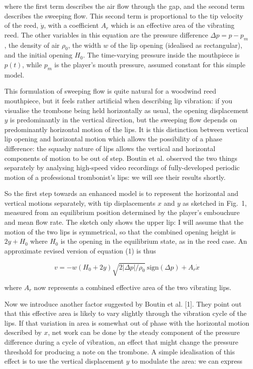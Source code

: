   where the first term describes the air flow through the gap, and the second 
  term describes the sweeping flow. This second term is proportional to the tip 
  velocity of the reed, $\dot{y}$, with a coefficient $A_r$ which is an 
  effective area of the vibrating reed. The other variables in this equation 
  are the pressure difference $\Delta p = p-p_m$, the density of air $\rho_0$, 
  the width $w$ of the lip opening (idealised as rectangular), and the initial 
  opening $H_0$. The time-varying pressure inside the mouthpiece is $p(t)$, 
  while $p_m$ is the player's mouth pressure, assumed constant for this simple 
  model. 

  This formulation of sweeping flow is quite natural for a woodwind reed 
  mouthpiece, but it feels rather artificial when describing lip vibration: if 
  you visualise the trombone being held horizontally as usual, the opening 
  displacement $y$ is predominantly in the vertical direction, but the sweeping 
  flow depends on predominantly horizontal motion of the lips. It is this 
  distinction between vertical lip opening and horizontal motion which allows 
  the possibility of a phase difference: the squashy nature of lips allows the 
  vertical and horizontal components of motion to be out of step. Boutin et al. 
  observed the two things separately by analysing high-speed video recordings 
  of fully-developed periodic motion of a professional trombonist's lips: we 
  will see their results shortly. 

  So the first step towards an enhanced model is to represent the horizontal 
  and vertical motions separately, with tip displacements $x$ and $y$ as 
  sketched in Fig.\ 1, measured from an equilibrium position determined by the 
  player's embouchure and mean flow rate. The sketch only shows the upper lip: 
  I will assume that the motion of the two lips is symmetrical, so that the 
  combined opening height is $2y+H_0$ where $H_0$ is the opening in the 
  equilibrium state, as in the reed case. An approximate revised version of 
  equation (1) is thus 

  $$v=-w(H_0+2y) \sqrt{2 |\Delta p|/\rho_0} \mathrm{~sign} (\Delta p)+A_r 
  \dot{x} \tag{2}$$ 

  where $A_r$ now represents a combined effective area of the two vibrating 
  lips. 


  Now we introduce another factor suggested by Boutin et al. [1]. They point 
  out that this effective area is likely to vary slightly through the vibration 
  cycle of the lips. If that variation in area is somewhat out of phase with 
  the horizontal motion described by $x$, net work can be done by the steady 
  component of the pressure difference during a cycle of vibration, an effect 
  that might change the pressure threshold for producing a note on the 
  trombone. A simple idealisation of this effect is to use the vertical 
  displacement $y$ to modulate the area: we can express 


